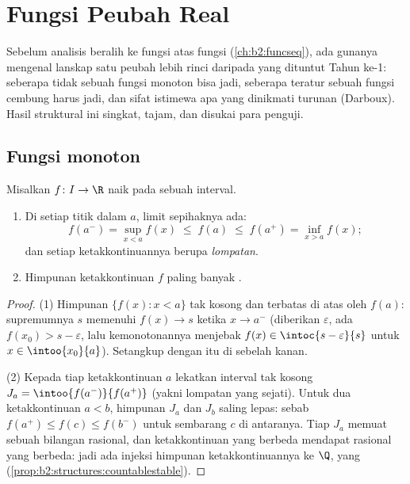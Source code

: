 \chapter{Fungsi Peubah Real}\label{ch:b2:realfun}

Sebelum analisis beralih ke fungsi atas fungsi (\cref{ch:b2:funcseq}),
ada gunanya mengenal lanskap satu peubah lebih rinci daripada yang
dituntut Tahun ke-1: seberapa tidak  sebuah fungsi monoton bisa
jadi, seberapa teratur sebuah fungsi cembung harus jadi, dan sifat
istimewa apa yang dinikmati turunan (Darboux). Hasil struktural ini
singkat, tajam, dan disukai para penguji.

\section{Fungsi monoton}

\begin{theorem}\label{thm:b2:realfun:monotone}
Misalkan $f \colon I \to \R$ naik pada sebuah interval.
\begin{enumerate}
  \item Di setiap titik dalam $a$, limit sepihaknya ada:
        \[
        f(a^-) = \sup_{x < a} f(x) \;\leq\; f(a) \;\leq\;
        f(a^+) = \inf_{x > a} f(x) ;
        \]
        dan setiap ketakkontinuannya berupa \emph{lompatan}.
  \item Himpunan ketakkontinuan $f$ paling banyak
        .
\end{enumerate}
\end{theorem}

\begin{proof}
(1) Himpunan $\{f(x) : x < a\}$ tak kosong dan terbatas di atas oleh
$f(a)$: supremumnya $s$ memenuhi $f(x) \to s$ ketika $x \to a^-$
(diberikan $\varepsilon$, ada $f(x_0) > s - \varepsilon$, lalu
kemonotonannya menjebak $f(x) \in \intoc{s - \varepsilon}{s}$ untuk $x
\in \intoo{x_0}{a}$). Setangkup dengan itu di sebelah kanan.

(2) Kepada tiap ketakkontinuan $a$ lekatkan interval  tak kosong
$J_a = \intoo{f(a^-)}{f(a^+)}$ (yakni lompatan yang sejati). Untuk dua
ketakkontinuan $a < b$, himpunan $J_a$ dan $J_b$ saling lepas: sebab
$f(a^+) \leq f(c) \leq f(b^-)$ untuk sembarang $c$ di antaranya. Tiap
$J_a$ memuat sebuah bilangan rasional, dan ketakkontinuan yang berbeda
mendapat rasional yang berbeda: jadi ada injeksi himpunan
ketakkontinuannya ke $\Q$, yang 
(\cref{prop:b2:structures:countablestable}).
\end{proof}


